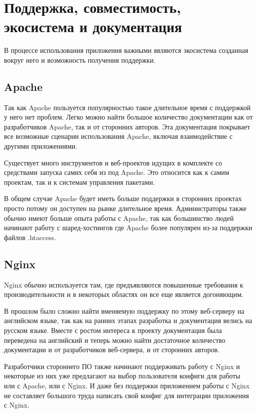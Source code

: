 \documentclass[14pt, a4paper]{article}
\begin{document}
\section*{Поддержка, совместимость, экосистема и документация}
В процессе использования приложения важными являются экосистема созданная 
вокруг него и возможность получения поддержки.

\subsection*{Apache}
Так как Apache пользуется популярностью такое длительное время с поддержкой у 
него нет проблем. Легко можно найти большое количество документации как от разработчиков 
Apache, так и от сторонних авторов. Эта документация покрывает все возможные сценарии 
использования Apache, включая взаимодействие с другими приложениями.


Существует много инструментов и веб-проектов идущих в комплекте со средствами запуска самих 
себя из под Apache. Это относится как к самим проектам, так и к системам управления пакетами.


В общем случае Apache будет иметь больше поддержки в сторонних проектах просто потому он 
доступен на рынке длительное время. Администраторы также обычно имеют больше опыта работы 
с Apache, так как большинство людей начинают работу с шаред-хостингов где Apache более 
популярен из-за поддержки файлов .htaccess.

\subsection*{Nginx}
Nginx обычно используется там, где предъявляются повышенные требования к производительности 
и в некоторых областях он все еще является догоняющим.


В прошлом было сложно найти вменяемую поддержку по этому веб-серверу на английском языке, 
так как на ранних этапах разработка и документация велись на русском языке. Вместе с ростом 
интереса к проекту документация была переведена на английский и теперь можно найти достаточное 
количество документации и от разработчиков веб-сервера, и от сторонних авторов.


Разработчики стороннего ПО также начинают поддерживать работу с Nginx и некоторые из них уже 
предлагают на выбор пользователя конфиги для работы или с Apache, или с Nginx. И даже без поддержки 
приложением работы с Nginx не составляет большого труда написать свой конфиг для интеграции приложения с Nginx.\\
\end{document}
